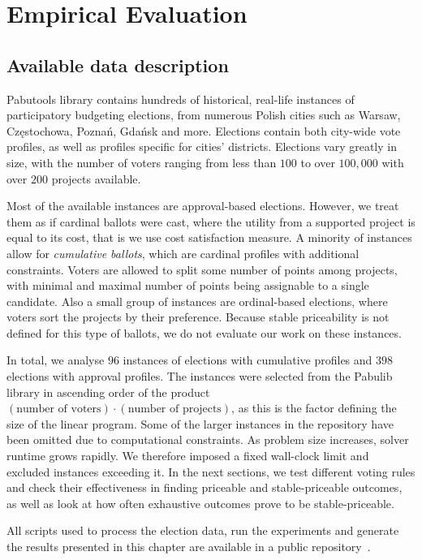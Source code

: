 \chapter{Empirical Evaluation}\label{chap:4}
\section{Available data description}
Pabutools library contains hundreds of historical, real-life instances of participatory budgeting elections, from numerous Polish cities such as Warsaw, Częstochowa, Poznań, Gdańsk and more. Elections contain both city-wide vote profiles, as well as profiles specific for cities' districts. Elections vary greatly in size, with the number of voters ranging from less than $100$ to over $100,000$ with over $200$ projects available.

Most of the available instances are approval-based elections. However, we treat them as if cardinal ballots were cast, where the utility from a supported project is equal to its cost, that is we use cost satisfaction measure. A minority of instances allow for \emph{cumulative ballots}, which are cardinal profiles with additional constraints. Voters are allowed to split some number of points among projects, with minimal and maximal number of points being assignable to a single candidate. Also a small group of instances are ordinal-based elections, where voters sort the projects by their preference. Because stable priceability is not defined for this type of ballots, we do not evaluate our work on these instances.

In total, we analyse $96$ instances of elections with cumulative profiles and $398$ elections with approval profiles. The instances were selected from the Pabulib library in ascending order of the product $(\text{number of voters})\cdot(\text{number of projects})$, as this is the factor defining the size of the linear program. Some of the larger instances in the repository have been omitted due to computational constraints. As problem size increases, solver runtime grows rapidly. We therefore imposed a fixed wall-clock limit and excluded instances exceeding it.  In the next sections, we test different voting rules and check their effectiveness in finding priceable and stable-priceable outcomes, as well as look at how often exhaustive outcomes prove to be stable-priceable.

All scripts used to process the election data, run the experiments and generate the results presented in this chapter are available in a public repository~\cite{Chapter4Scripts}.
